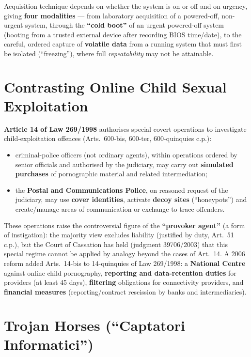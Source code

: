 \documentclass[11pt,a4paper,openany]{report}
\theoremstyle{definition}
\theoremstyle{plain}
\theoremstyle{remark}
\begin{document}
Acquisition technique depends on whether the system is on or off and on urgency, giving \textbf{four modalities} --- from laboratory acquisition of a powered-off, non-urgent system, through the \textbf{``cold boot''} of an urgent powered-off system (booting from a trusted external device after recording BIOS time/date), to the careful, ordered capture of \textbf{volatile data} from a running system that must first be isolated (``freezing''), where full \emph{repeatability} may not be attainable.

\section{Contrasting Online Child Sexual Exploitation}

\textbf{Article 14 of Law 269/1998} authorises special covert operations to investigate child-exploitation offences (Arts.\ 600-bis, 600-ter, 600-quinquies c.p.):
\begin{itemize}
    \item criminal-police officers (not ordinary agents), within operations ordered by senior officials and authorised by the judiciary, may carry out \textbf{simulated purchases} of pornographic material and related intermediation;
    \item the \textbf{Postal and Communications Police}, on reasoned request of the judiciary, may use \textbf{cover identities}, activate \textbf{decoy sites} (``honeypots'') and create/manage areas of communication or exchange to trace offenders.
\end{itemize}
These operations raise the controversial figure of the \textbf{``provoker agent''} (a form of instigation): the majority view excludes liability (justified by duty, Art.\ 51 c.p.), but the Court of Cassation has held (judgment 39706/2003) that this special regime cannot be applied by analogy beyond the cases of Art.\ 14. A 2006 reform added Arts.\ 14-bis to 14-quinquies of Law 269/1998: a \textbf{National Centre} against online child pornography, \textbf{reporting and data-retention duties} for providers (at least 45 days), \textbf{filtering} obligations for connectivity providers, and \textbf{financial measures} (reporting/contract rescission by banks and intermediaries).

\section{Trojan Horses (``Captatori Informatici'')}
\end{document}

